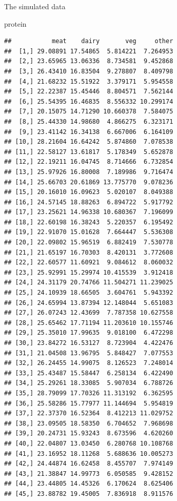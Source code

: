 \documentclass[
  ignorenonframetext,
]{beamer}
\newenvironment{Shaded}{\begin{snugshade}}{\end{snugshade}}
\newcommand{\NormalTok}[1]{#1}
\begin{document}
\begin{frame}[fragile]{The simulated data}
\protect\hypertarget{the-simulated-data}{}
\begin{Shaded}
\begin{Highlighting}[]
\NormalTok{protein}
\end{Highlighting}
\end{Shaded}

\begin{verbatim}
##           meat    dairy       veg     other
##  [1,] 29.08891 17.54865  5.814221  7.264953
##  [2,] 23.65965 13.06336  8.734581  9.452868
##  [3,] 26.43410 16.83504  9.278807  8.409798
##  [4,] 21.68232 15.51922  3.379171  5.954558
##  [5,] 22.22387 15.45446  8.804571  7.562144
##  [6,] 25.54395 16.46835  8.556332 10.299174
##  [7,] 20.15075 14.71290 10.660378  7.584075
##  [8,] 25.44330 14.98680  4.866275  6.323171
##  [9,] 23.41142 16.34138  6.667006  6.164109
## [10,] 28.21604 16.64242  5.874860  7.078538
## [11,] 22.58127 13.61817  5.178349  5.652878
## [12,] 22.19211 16.04745  8.714666  6.732854
## [13,] 25.97926 16.80008  7.189986  9.716474
## [14,] 25.66703 20.61869 13.775770  9.078236
## [15,] 20.16010 16.09623  5.020107  8.049388
## [16,] 24.57145 18.88263  6.894722  5.917792
## [17,] 23.25621 14.96338 10.680367  7.196099
## [18,] 22.60198 16.38243  5.220357  6.195492
## [19,] 22.91070 15.01628  7.664447  5.536308
## [20,] 22.09802 15.96519  6.882419  7.530778
## [21,] 21.65197 16.70303  8.420131  3.772608
## [22,] 22.60577 11.60921  9.084612  8.060032
## [23,] 25.92991 15.29974 10.415539  3.912418
## [24,] 24.31179 20.74766 11.504271 11.239025
## [25,] 24.10939 18.66505  3.604761  5.943392
## [26,] 24.65994 13.87394 12.148044  5.651083
## [27,] 26.07243 12.43699  7.787358 10.627558
## [28,] 25.65462 17.71194 11.203610 10.155746
## [29,] 25.35010 17.99635  9.018100  6.472298
## [30,] 23.84272 16.53127  8.723904  4.422476
## [31,] 21.04508 13.96795  5.848427  7.077553
## [32,] 26.24455 14.99075  8.126523  7.248014
## [33,] 25.43487 15.58447  6.258134  6.422490
## [34,] 25.29261 18.33085  5.907034  6.788726
## [35,] 28.79099 17.70326 11.313192  6.362595
## [36,] 25.58286 15.77977 11.144694  5.954819
## [37,] 22.37370 16.52364  8.412213 11.029752
## [38,] 23.09505 18.58350  6.704652  7.968698
## [39,] 20.24731 15.93243  8.673596  4.620260
## [40,] 22.04807 13.03450  6.280768 10.108768
## [41,] 23.16952 18.11268  5.688636 10.005273
## [42,] 24.44874 16.62458  8.455707  7.974149
## [43,] 21.38847 14.99773  6.050585  9.428152
## [44,] 23.44805 14.45326  6.170624  8.625406
## [45,] 23.88782 19.45005  7.836918  8.911576

\end{verbatim}
\end{frame}
\end{document}

